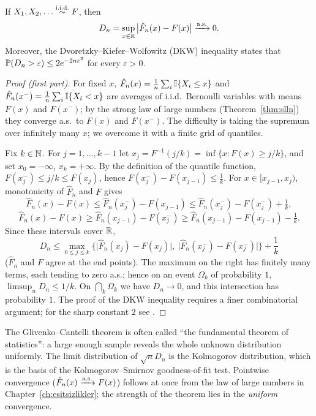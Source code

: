 \documentclass[main.tex]{subfiles}
\begin{document}
\begin{theorem}\label{thm:glivenko}
If $X_1,X_2,\dots\iid F$, then
\[
D_n=\sup_{x\in\R}\big|\hat F_n(x)-F(x)\big|\asto 0 .
\]
Moreover, the Dvoretzky--Kiefer--Wolfowitz (DKW) inequality \cite{dkw56,massart90} states that $\P(D_n>\varepsilon)\le 2e^{-2n\varepsilon^2}$ for every $\varepsilon>0$.
\end{theorem}
\begin{proof}[Proof (first part)]
For fixed $x$, $\hat F_n(x)=\frac1n\sum_i\I\{X_i\le x\}$ and $\hat F_n(x^-)=\frac1n\sum_i\I\{X_i<x\}$ are averages of i.i.d.\ Bernoulli variables with means $F(x)$ and $F(x^-)$; by the strong law of large numbers (Theorem~\ref{thm:slln}) they converge a.s.\ to $F(x)$ and $F(x^-)$. The difficulty is taking the supremum over infinitely many $x$; we overcome it with a finite grid of quantiles.

Fix $k\in\N$. For $j=1,\dots,k-1$ let $x_j=F^{-1}(j/k)=\inf\{x:F(x)\ge j/k\}$, and set $x_0=-\infty$, $x_k=+\infty$. By the definition of the quantile function, $F(x_j^-)\le j/k\le F(x_j)$, hence $F(x_j^-)-F(x_{j-1})\le\frac1k$. For $x\in[x_{j-1},x_j)$, monotonicity of $\hat F_n$ and $F$ gives
\[
\hat F_n(x)-F(x)\le\hat F_n(x_j^-)-F(x_{j-1})\le\hat F_n(x_j^-)-F(x_j^-)+\tfrac1k,
\]
\[
\hat F_n(x)-F(x)\ge\hat F_n(x_{j-1})-F(x_j^-)\ge\hat F_n(x_{j-1})-F(x_{j-1})-\tfrac1k .
\]
Since these intervals cover $\R$,
\[
D_n\le\max_{0\le j\le k}\Big\{\big|\hat F_n(x_j)-F(x_j)\big|,\ \big|\hat F_n(x_j^-)-F(x_j^-)\big|\Big\}+\frac1k
\]
($\hat F_n$ and $F$ agree at the end points). The maximum on the right has finitely many terms, each tending to zero a.s.; hence on an event $\Omega_k$ of probability $1$, $\limsup_nD_n\le1/k$. On $\bigcap_k\Omega_k$ we have $D_n\to0$, and this intersection has probability $1$. The proof of the DKW inequality requires a finer combinatorial argument; for the sharp constant $2$ see \cite{massart90}.
\end{proof}

\begin{remark}
The Glivenko--Cantelli theorem is often called ``the fundamental theorem of statistics'': a large enough sample reveals the whole unknown distribution uniformly. The limit distribution of $\sqrt{n}D_n$ is the Kolmogorov distribution, which is the basis of the Kolmogorov--Smirnov goodness-of-fit test. Pointwise convergence ($\hat F_n(x)\asto F(x)$) follows at once from the law of large numbers in Chapter~\ref{ch:esitsizlikler}; the strength of the theorem lies in the \emph{uniform} convergence.
\end{remark}
\end{document}
